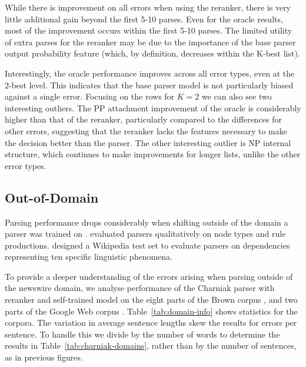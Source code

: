 While there is improvement on all errors when using the reranker, there is very
little additional gain beyond the first 5-10 parses.  Even for the oracle
results, most of the improvement occurs within the first 5-10 parses.  The
limited utility of extra parses for the reranker may be due to the importance
of the base parser output probability feature (which, by definition, decreases
within the K-best list).

Interestingly, the oracle performance improves across all error types, even at
the 2-best level.  This indicates that the base parser model is not
particularly biased against a single error.  Focusing on the rows for $K=2$ we
can also see two interesting outliers.  The PP attachment improvement of the
oracle is considerably higher than that of the reranker, particularly compared
to the differences for other errors, suggesting that the reranker lacks the
features necessary to make the decision better than the parser.  The other
interesting outlier is NP internal structure, which continues to make
improvements for longer lists, unlike the other error types.

\subsection{Out-of-Domain}

Parsing performance drops considerably when shifting outside of the domain a
parser was trained on \parencite{Gildea:2001}.
\textcite{Clegg:2005:EIT:1626315.1626317} evaluated parsers qualitatively on
node types and rule productions.  \textcite{Bender:2011:PEO:2145432.2145479}
designed a Wikipedia test set to evaluate parsers on dependencies representing
ten specific linguistic phenomena.

To provide a deeper understanding of the errors arising when parsing outside of
the newswire domain, we analyse performance of the Charniak parser with
reranker and self-trained model on the eight parts of the Brown corpus
\parencite{ptb}, and two parts of the Google Web
corpus \parencite{Petrov:2012}.  Table~\ref{tab:domain-info} shows statistics for
the corpora.  The variation in average sentence lengths skew the results for
errors per sentence.  To handle this we divide by the number of words to
determine the results in Table~\ref{tab:charniak-domains}, rather than by the
number of sentences, as in previous figures.


